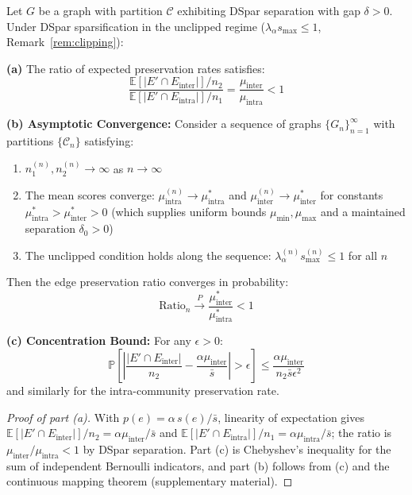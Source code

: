 \begin{theorem}
\label{thm:ratio}
Let $G$ be a graph with partition $\mathcal{C}$ exhibiting DSpar separation with gap $\delta > 0$. Under DSpar sparsification in the unclipped regime ($\lambda_\alpha s_{\max} \le 1$, Remark~\ref{rem:clipping}):

\textbf{(a)} The ratio of expected preservation rates satisfies:
\begin{equation}
\frac{\mathbb{E}[|E' \cap E_{\text{inter}}|] / n_2}{\mathbb{E}[|E' \cap E_{\text{intra}}|] / n_1} = \frac{\mu_{\text{inter}}}{\mu_{\text{intra}}} < 1
\end{equation}

\textbf{(b) Asymptotic Convergence:} Consider a sequence of graphs $\{G_n\}_{n=1}^\infty$ with partitions $\{\mathcal{C}_n\}$ satisfying:
\begin{enumerate}
    \item[(i)] $n_1^{(n)}, n_2^{(n)} \to \infty$ as $n \to \infty$
    \item[(ii)] The mean scores converge: $\mu_{\text{intra}}^{(n)} \to \mu_{\text{intra}}^*$ and $\mu_{\text{inter}}^{(n)} \to \mu_{\text{inter}}^*$ for constants $\mu_{\text{intra}}^* > \mu_{\text{inter}}^* > 0$ (which supplies uniform bounds $\mu_{\min}, \mu_{\max}$ and a maintained separation $\delta_0 > 0$)
    \item[(iii)] The unclipped condition holds along the sequence: $\lambda_\alpha^{(n)} s_{\max}^{(n)} \le 1$ for all $n$
\end{enumerate}
Then the edge preservation ratio converges in probability:
\begin{equation}
\text{Ratio}_n \xrightarrow{P} \frac{\mu_{\text{inter}}^*}{\mu_{\text{intra}}^*} < 1
\end{equation}

\textbf{(c) Concentration Bound:} For any $\epsilon > 0$:
\begin{equation}
\mathbb{P}\left[ \left| \frac{|E' \cap E_{\text{inter}}|}{n_2} - \frac{\alpha \mu_{\text{inter}}}{\bar{s}} \right| > \epsilon \right] \leq \frac{\alpha \mu_{\text{inter}}}{n_2 \bar{s} \epsilon^2}
\end{equation}
and similarly for the intra-community preservation rate.
\end{theorem}

\begin{proof}[Proof of part (a)]
With $p(e) = \alpha\, s(e)/\bar{s}$, linearity of expectation gives $\mathbb{E}[|E' \cap E_{\text{inter}}|]/n_2 = \alpha \mu_{\text{inter}}/\bar{s}$ and $\mathbb{E}[|E' \cap E_{\text{intra}}|]/n_1 = \alpha \mu_{\text{intra}}/\bar{s}$; the ratio is $\mu_{\text{inter}}/\mu_{\text{intra}} < 1$ by DSpar separation. Part (c) is Chebyshev's inequality for the sum of independent Bernoulli indicators, and part (b) follows from (c) and the continuous mapping theorem (supplementary material).
\end{proof}


